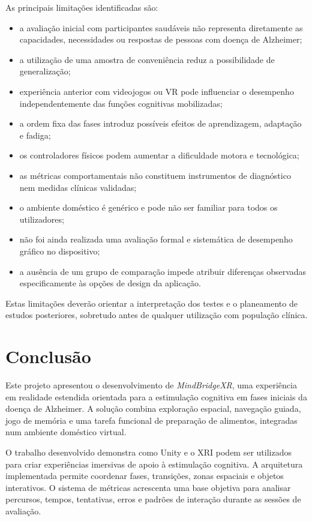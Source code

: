 \documentclass[12pt,a4paper,oneside]{report}
\newcommand{\blankpage}{
    \clearpage
    \thispagestyle{empty}
    \null
    \clearpage
}
\begin{document}
As principais limitações identificadas são:

\begin{itemize}
    \item a avaliação inicial com participantes saudáveis não representa diretamente as capacidades, necessidades ou respostas de pessoas com doença de Alzheimer;
    \item a utilização de uma amostra de conveniência reduz a possibilidade de generalização;
    \item experiência anterior com videojogos ou \ac{VR} pode influenciar o desempenho independentemente das funções cognitivas mobilizadas;
    \item a ordem fixa das fases introduz possíveis efeitos de aprendizagem, adaptação e fadiga;
    \item os controladores físicos podem aumentar a dificuldade motora e tecnológica;
    \item as métricas comportamentais não constituem instrumentos de diagnóstico nem medidas clínicas validadas;
    \item o ambiente doméstico é genérico e pode não ser familiar para todos os utilizadores;
    \item não foi ainda realizada uma avaliação formal e sistemática de desempenho gráfico no dispositivo;
    \item a ausência de um grupo de comparação impede atribuir diferenças observadas especificamente às opções de design da aplicação.
\end{itemize}

Estas limitações deverão orientar a interpretação dos testes e o planeamento de estudos posteriores, sobretudo antes de qualquer utilização com população clínica.

\blankpage

\chapter{Conclusão}

Este projeto apresentou o desenvolvimento de \textit{MindBridgeXR}, uma experiência em realidade estendida orientada para a estimulação cognitiva em fases iniciais da doença de Alzheimer. A solução combina exploração espacial, navegação guiada, jogo de memória e uma tarefa funcional de preparação de alimentos, integradas num ambiente doméstico virtual.

O trabalho desenvolvido demonstra como Unity e o \ac{XRI} podem ser utilizados para criar experiências imersivas de apoio à estimulação cognitiva. A arquitetura implementada permite coordenar fases, transições, zonas espaciais e objetos interativos. O sistema de métricas acrescenta uma base objetiva para analisar percursos, tempos, tentativas, erros e padrões de interação durante as sessões de avaliação.
\end{document}
